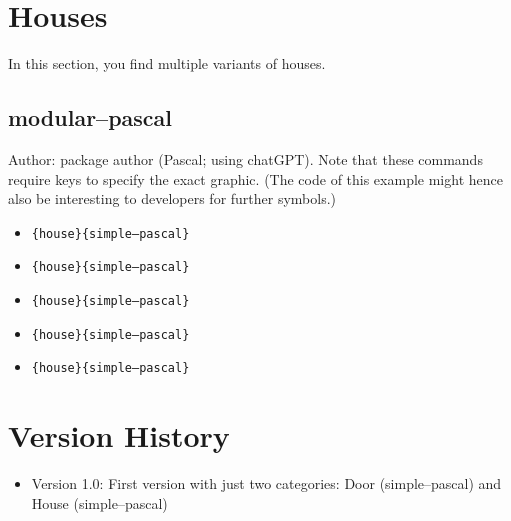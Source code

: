 \documentclass{article}
\begin{document}
\section{Houses}

In this section, you find multiple variants of houses.

\subsection{modular--pascal}

Author: package author (Pascal; using chatGPT). Note that these commands require keys to specify the exact graphic. (The code of this example might hence also be interesting to developers for further symbols.)

\begin{itemize}
  \item \texttt{\string\everydaySymbol\{house\}\{simple--pascal\}} \dotfill\ 

  \item \texttt{\string\everydaySymbol[config=\{middleDoor,chimney\}]\{house\}\{simple--pascal\}} \dotfill\ 

  \item \texttt{\string\everydaySymbol[config=\{rightDoor,leftWindow\}]\{house\}\{simple--pascal\}} \dotfill\ 

  \item \texttt{\string\everydaySymbol[config=twoWindows,color=red]\{house\}\{simple--pascal\}} \dotfill\ 

  \item \texttt{\string\everydaySymbol[config=\{twoWindows,middleDoor\}]\{house\}\{simple--pascal\}} \dotfill\ 

\end{itemize}

\section*{Version History}

\begin{itemize}
  \item Version 1.0: First version with just two categories: Door (simple--pascal) and House (simple--pascal)
\end{itemize}
\end{document}

